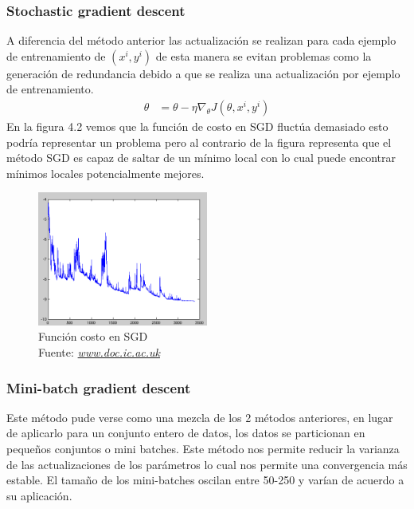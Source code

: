 \subsubsection{Stochastic gradient descent}
A diferencia del método anterior las actualización se realizan para cada ejemplo de entrenamiento de $(x^{i},y^{i})$ de esta manera se evitan problemas como la generación de redundancia debido a que se realiza una actualización por ejemplo de entrenamiento.
\begin{equation}
\label{sgds}
\begin{aligned}
\theta &= \theta - \eta \nabla_{\theta} J(\theta,x^{i},y^{i})
\end{aligned}
\end{equation}
En la figura 4.2 vemos que la función de costo en SGD fluctúa demasiado esto podría representar un problema pero al contrario de la figura representa que el método SGD es capaz de saltar de un mínimo local con lo cual puede encontrar mínimos locales potencialmente mejores.

\begin{figure}[H]
	\centering
	\includegraphics[width=0.5\textwidth]{Figures/sgd.png}
	\caption{Función costo en SGD \\ Fuente:  \href{https://www.doc.ic.ac.uk/~js4416/163/website/neural-networks/optimisers.html}{\textit{www.doc.ic.ac.uk}}}
	\label{funcion costo}
\end{figure} 

\subsubsection{Mini-batch gradient descent}
Este método pude verse como una mezcla de los 2 métodos anteriores, en lugar de aplicarlo para un conjunto entero de datos, los datos se particionan en pequeños conjuntos o mini batches.
Este método nos permite reducir la varianza de las actualizaciones de los parámetros lo cual nos permite una convergencia más estable. El tamaño de los mini-batches oscilan entre 50-250 y varían de acuerdo a su aplicación.

